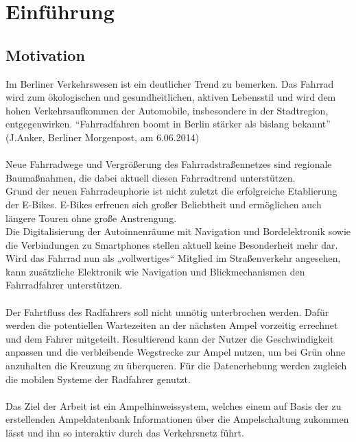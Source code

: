 \chapter{Einführung}
\section{Motivation}
Im Berliner Verkehrswesen ist ein deutlicher Trend zu bemerken. Das Fahrrad wird zum ökologischen und gesundheitlichen, aktiven Lebensstil und wird dem hohen Verkehrsaufkommen der Automobile, insbesondere in der Stadtregion, entgegenwirken. “Fahrradfahren boomt in Berlin stärker als bislang bekannt”  (J.Anker, Berliner Morgenpost, am 6.06.2014)\\\\
Neue Fahrradwege und Vergrößerung des Fahrradstraßennetzes sind regionale Baumaßnahmen, die dabei aktuell diesen Fahrradtrend unterstützen.\\ 
Grund der neuen Fahrradeuphorie ist nicht zuletzt die erfolgreiche Etablierung der E-Bikes. E-Bikes erfreuen sich großer Beliebtheit und ermöglichen auch längere Touren ohne große Anstrengung.\\ Die Digitalisierung der Autoinnenräume mit Navigation und Bordelektronik sowie die Verbindungen zu Smartphones stellen aktuell keine Besonderheit mehr dar. Wird das Fahrrad nun als „vollwertiges“ Mitglied im Straßenverkehr angesehen, kann zusätzliche Elektronik wie Navigation und Blickmechanismen den Fahrradfahrer unterstützen.\\\\ 
Der Fahrtfluss des Radfahrers soll nicht unnötig unterbrochen werden. Dafür werden die potentiellen Wartezeiten an der nächsten Ampel vorzeitig errechnet und dem Fahrer mitgeteilt. Resultierend kann der Nutzer die Geschwindigkeit anpassen und die verbleibende Wegstrecke zur Ampel nutzen, um bei Grün ohne anzuhalten die Kreuzung zu überqueren. Für die Datenerhebung werden zugleich die mobilen Systeme der Radfahrer genutzt.\\\\
Das Ziel der Arbeit ist ein Ampelhinweissystem, welches einem auf Basis der zu erstellenden  Ampeldatenbank Informationen über die Ampelschaltung zukommen lässt und ihn so interaktiv durch das Verkehrsnetz führt.
